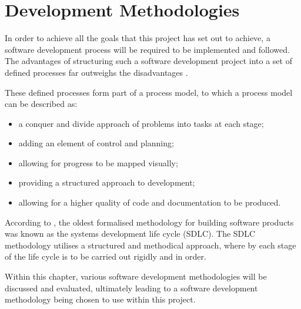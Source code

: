 \chapter{Development Methodologies}

In order to achieve all the goals that this project has set out to achieve, a 
software development process will be required to be implemented and followed. 
The advantages of structuring such a software development project into a set of 
defined processes far outweighs the disadvantages \citep{knott_dawson99}. 

These defined processes form part of a process model, to which a process model 
can be described as:
\begin{itemize}
	\item a conquer and divide approach of problems into tasks at each stage;
	\item adding an element of control and planning;
	\item allowing for progress to be mapped visually;
	\item providing a structured approach to development;
	\item allowing for a higher quality of code and documentation to be produced.
\end{itemize}

According to \citet{elliott04}, the oldest formalised methodology for building 
software products was known as the systems development life cycle (SDLC). The 
SDLC methodology utilises a structured and methodical approach, where by each 
stage of the life cycle is to be carried out rigidly and in order.

Within this chapter, various software development methodologies will be discussed 
and evaluated, ultimately leading to a software development methodology being 
chosen to use within this project.

\newpage


\newpage


\newpage


\newpage


\newpage


\newpage
